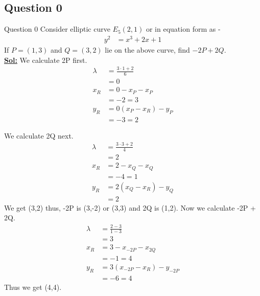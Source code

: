 \documentclass[xcolor=svgnames]{beamer}
\begin{document}
\subsection{Question 0}
\begin{frame}{Question 0}
    Consider elliptic curve $E_{5}(2,1)$ or in equation form as -
    \begin{align*}
        y^2 &= x^3 + 2x + 1
    \end{align*}
    If $P=(1,3)$ and $Q = (3,2)$ lie on the above curve, find $-2P +     2Q$.
    \\ \textbf{\underline{Sol:}} We calculate 2P first.
        \begin{align*}
            \lambda &= \frac{3\cdot 1 + 2}{6}
                \\  &= 0
                \\ x_R &= 0 - x_P - x_P
                \\ &= -2 = 3
                \\ y_R &= 0(x_P - x_R) - y_P
                \\ &= -3 = 2
        \end{align*}
\end{frame}
\begin{frame}{}
\footnotesize{
    We calculate 2Q next.
        \begin{align*}
            \lambda &= \frac{3\cdot 3 + 2}{4}
                \\  &= 2
                \\ x_R &= 2 - x_Q - x_Q
                \\ &= -4 = 1
                \\ y_R &= 2(x_Q - x_R) - y_Q
                \\ &= 2
        \end{align*}
        We get (3,2) thus, -2P is (3,-2) or (3,3) and 2Q is (1,2). Now we calculate -2P + 2Q.
        \begin{align*}
            \lambda &= \frac{2 - 3}{1 - 3}
                \\    &= 3
                \\ x_R &= 3 - x_{-2P} - x_{2Q}
                \\ &= -1 = 4
                \\ y_R &= 3(x_{-2P} - x_R) - y_{-2P}
                \\ &= -6 = 4
        \end{align*}
        Thus we get (4,4).
    }
\end{frame}
\end{document}
